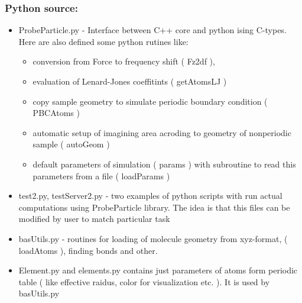 \subsubsection{Python source:}
\begin{itemize}
    \item ProbeParticle.py - Interface between C++ core and python ising
    C-types. Here are also defined some python rutines like:
    \begin{itemize}
        \item  conversion from Force to frequency shift ( Fz2df ),
        \item  evaluation of Lenard-Jones coeffitints ( getAtomsLJ )
        \item  copy sample geometry to simulate periodic boundary condition (
        PBCAtoms )
        \item automatic setup of imagining area acroding to geometry of
        nonperiodic sample ( autoGeom )
        \item default parameters of simulation ( params ) with subroutine to
        read this parameters from a file ( loadParams )
    \end{itemize}


    \item  test2.py, testServer2.py - two examples of python scripts with run
    actual computations using ProbeParticle library. The idea is that this files
    can be modified by user to match particular task
    \item basUtils.py - routines for loading of molecule geometry from
    xyz-format, ( loadAtoms ), finding bonds and other.
    \item Element.py and elements.py contains just parameters of atoms form
    periodic table ( like effective raidus, color for visualization etc. ). It
    is used by basUtils.py



\end{itemize}
